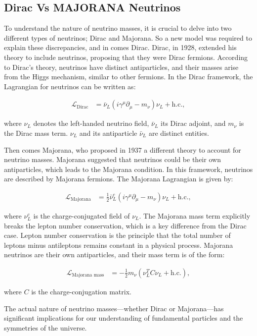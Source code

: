 \subsection{Dirac Vs MAJORANA Neutrinos}

To understand the nature of neutrino masses, it is crucial to delve into two different types of neutrinos; Dirac and Majorana.
So a new model was required to explain these discrepancies, and in comes Dirac.
Dirac, in 1928, extended his theory to include neutrinos, proposing that they were Dirac fermions.
According to Dirac's theory, neutrinos have distinct antiparticles, and their masses arise from the Higgs mechanism, similar to other fermions.
In the Dirac framework, the Lagrangian for neutrinos can be written as:

\begin{align}
  \mathcal{L}_{\text{Dirac}} &= \bar{\nu}_L (i\gamma^\mu \partial_\mu - m_\nu) \nu_L + \text{h.c.},
\end{align}

where \(\nu_L\) denotes the left-handed neutrino field, \(\bar{\nu}_L\) its Dirac adjoint, and \(m_\nu\) is the Dirac mass term.
\(\nu_L\) and its antiparticle \(\bar{\nu}_L\) are distinct entities.

Then comes Majorana, who proposed in 1937 a different theory to account for neutrino masses.
Majorana suggested that neutrinos could be their own antiparticles, which leads to the Majorana condition.
In this framework, neutrinos are described by Majorana fermions.
The Majorana Lagrangian is given by:

\begin{align}
  \mathcal{L}_{\text{Majorana}} &= \frac{1}{2} \bar{\nu}_L^c (i\gamma^\mu \partial_\mu - m_\nu) \nu_L + \text{h.c.},
\end{align}

where \(\nu_L^c\) is the charge-conjugated field of \(\nu_L\).
The Majorana mass term explicitly breaks the lepton number conservation, which is a key difference from the Dirac case.
Lepton number conservation is the principle that the total number of leptons minus antileptons remains constant in a physical process.
Majorana neutrinos are their own antiparticles, and their mass term is of the form:

\begin{align}
  \mathcal{L}_{\text{Majorana mass}} &= -\frac{1}{2} m_\nu (\nu_L^T C \nu_L + \text{h.c.}),
\end{align}

where \(C\) is the charge-conjugation matrix.


The actual nature of neutrino masses—whether Dirac or Majorana—has significant implications for our understanding of fundamental particles and the symmetries of the universe.
